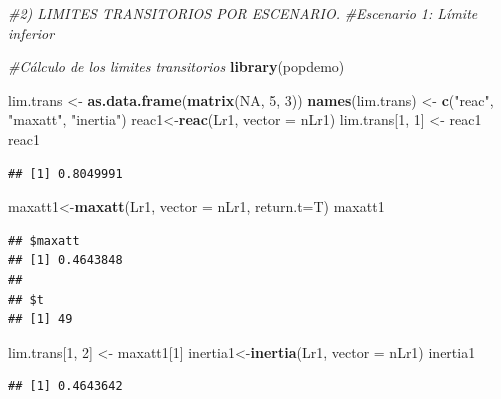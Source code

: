 \documentclass[
]{book}
\newenvironment{Shaded}{\begin{snugshade}}{\end{snugshade}}
\newcommand{\AttributeTok}[1]{\textcolor[rgb]{0.13,0.29,0.53}{#1}}
\newcommand{\CommentTok}[1]{\textcolor[rgb]{0.56,0.35,0.01}{\textit{#1}}}
\newcommand{\ConstantTok}[1]{\textcolor[rgb]{0.56,0.35,0.01}{#1}}
\newcommand{\DecValTok}[1]{\textcolor[rgb]{0.00,0.00,0.81}{#1}}
\newcommand{\FunctionTok}[1]{\textcolor[rgb]{0.13,0.29,0.53}{\textbf{#1}}}
\newcommand{\NormalTok}[1]{#1}
\newcommand{\OtherTok}[1]{\textcolor[rgb]{0.56,0.35,0.01}{#1}}
\newcommand{\StringTok}[1]{\textcolor[rgb]{0.31,0.60,0.02}{#1}}
\theoremstyle{definition}
\theoremstyle{definition}
\theoremstyle{definition}
\theoremstyle{definition}
\theoremstyle{remark}
\begin{document}
\begin{Shaded}
\begin{Highlighting}[]
\CommentTok{\#2) LIMITES TRANSITORIOS POR ESCENARIO.}
\CommentTok{\#Escenario 1: Límite inferior}

\CommentTok{\#Cálculo de los limites transitorios}
\FunctionTok{library}\NormalTok{(popdemo)}

\NormalTok{lim.trans }\OtherTok{\textless{}{-}} \FunctionTok{as.data.frame}\NormalTok{(}\FunctionTok{matrix}\NormalTok{(}\ConstantTok{NA}\NormalTok{, }\DecValTok{5}\NormalTok{, }\DecValTok{3}\NormalTok{))}
\FunctionTok{names}\NormalTok{(lim.trans) }\OtherTok{\textless{}{-}} \FunctionTok{c}\NormalTok{(}\StringTok{"reac"}\NormalTok{, }\StringTok{"maxatt"}\NormalTok{, }\StringTok{"inertia"}\NormalTok{)}
\NormalTok{reac1}\OtherTok{\textless{}{-}}\FunctionTok{reac}\NormalTok{(Lr1, }\AttributeTok{vector =}\NormalTok{ nLr1)}
\NormalTok{lim.trans[}\DecValTok{1}\NormalTok{, }\DecValTok{1}\NormalTok{] }\OtherTok{\textless{}{-}}\NormalTok{ reac1}
\NormalTok{reac1}
\end{Highlighting}
\end{Shaded}

\begin{verbatim}
## [1] 0.8049991
\end{verbatim}

\begin{Shaded}
\begin{Highlighting}[]
\NormalTok{maxatt1}\OtherTok{\textless{}{-}}\FunctionTok{maxatt}\NormalTok{(Lr1, }\AttributeTok{vector =}\NormalTok{ nLr1, }\AttributeTok{return.t=}\NormalTok{T)}
\NormalTok{maxatt1}
\end{Highlighting}
\end{Shaded}

\begin{verbatim}
## $maxatt
## [1] 0.4643848
## 
## $t
## [1] 49
\end{verbatim}

\begin{Shaded}
\begin{Highlighting}[]
\NormalTok{lim.trans[}\DecValTok{1}\NormalTok{, }\DecValTok{2}\NormalTok{] }\OtherTok{\textless{}{-}}\NormalTok{ maxatt1[}\DecValTok{1}\NormalTok{]}
\NormalTok{inertia1}\OtherTok{\textless{}{-}}\FunctionTok{inertia}\NormalTok{(Lr1, }\AttributeTok{vector =}\NormalTok{ nLr1)}
\NormalTok{inertia1}
\end{Highlighting}
\end{Shaded}

\begin{verbatim}
## [1] 0.4643642
\end{verbatim}
\end{document}

